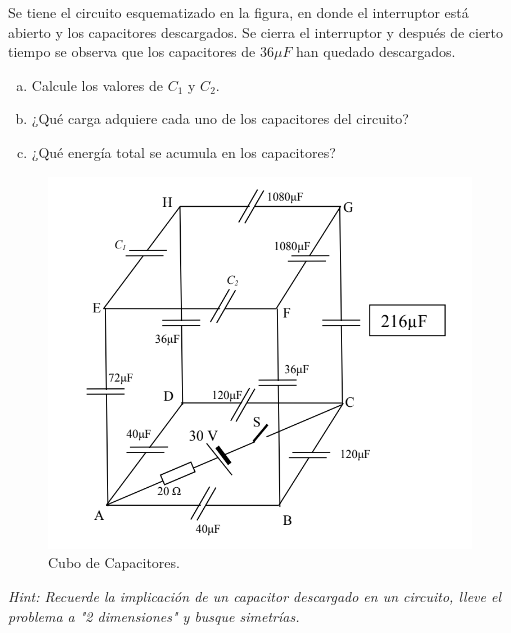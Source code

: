 \begin{mdframed}[style=warning]
	\begin{ejercicio}
		Se tiene el circuito esquematizado en la figura, en donde el interruptor está abierto y los capacitores descargados. Se cierra el interruptor y después de cierto tiempo se observa que los capacitores de $36\mu F$ han quedado descargados.
		\begin{enumerate}[a)]
			\item Calcule los valores de $C_1$ y $C_2$.
			\item ¿Qué carga adquiere cada uno de los capacitores del circuito?
			\item ¿Qué energía total se acumula en los capacitores?
		\end{enumerate}
		\begin{figure}[H]
			\centering
			\includegraphics[scale=0.3]{./img/cubo.png}
			\caption{Cubo de Capacitores.}
			\label{ej3}
		\end{figure}
		\textit{Hint: Recuerde la implicación de un capacitor descargado en un circuito, lleve el problema a "2 dimensiones" y busque simetrías.}
	\end{ejercicio}
\end{mdframed}






